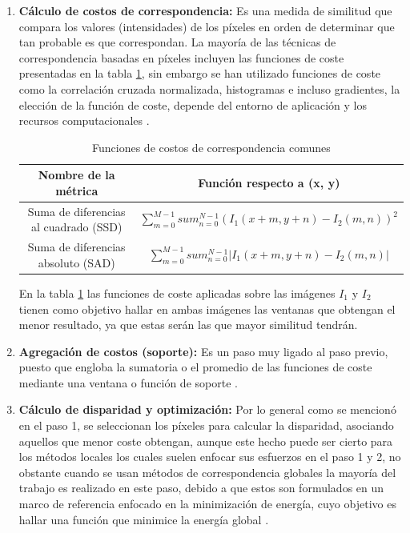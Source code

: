 \begin{enumerate}
    \item \textbf{Cálculo de costos de correspondencia:} Es una medida de similitud que compara los valores (intensidades) de los píxeles en orden de determinar que tan probable es que correspondan. La mayoría de las técnicas de correspondencia basadas en píxeles incluyen las funciones de coste presentadas en la tabla \ref{matchingCostTypes}, sin embargo se han utilizado funciones de coste como la correlación cruzada normalizada, histogramas e incluso gradientes, la elección de la función de coste, depende del entorno de aplicación y los recursos computacionales \cite[p~3]{Scharstein2002}.
    \begin{table}[H]
    \centering
    \renewcommand{\arraystretch}{2}
    \caption{Funciones de costos de correspondencia comunes}
    \label{matchingCostTypes}
    \begin{tabular}{|c|c|}
    \hline
    Nombre de la métrica & Función respecto a (x, y) \\
    \hline
    Suma de diferencias al cuadrado (SSD) & $\sum_{m=0}^{M-1}sum_{n=0}^{N-1}(I_{1}(x+m, y+n) - I_{2}(m, n))^{2}$    \\
    \hline
    Suma de diferencias absoluto (SAD)    & $\sum_{m=0}^{M-1}sum_{n=0}^{N-1}\lvert I_{1}(x+m, y+n) - I_{2}(m, n)\rvert$ \\
    \hline
    \end{tabular}
    \end{table}
    En la tabla \ref{matchingCostTypes} las funciones de coste aplicadas sobre las imágenes $I_{1}$ y $I_{2}$ tienen como objetivo hallar en ambas imágenes las ventanas que obtengan el menor resultado, ya que estas serán las que mayor similitud tendrán.
    \item \textbf{Agregación de costos (soporte):} Es un paso muy ligado al paso previo, puesto que engloba la sumatoria o el promedio de las funciones de coste mediante una ventana o función de soporte \cite[p~4]{Scharstein2002}. 
    \item \textbf{Cálculo de disparidad y optimización:} Por lo general como se mencionó en el paso 1, se seleccionan los píxeles para calcular la disparidad, asociando aquellos que menor coste obtengan, aunque este hecho puede ser cierto para los métodos locales los cuales suelen enfocar sus esfuerzos en el paso 1 y 2, no obstante cuando se usan métodos de correspondencia globales la mayoría del trabajo es realizado en este paso, debido a que estos son formulados en un marco de referencia enfocado en la minimización de energía, cuyo objetivo es hallar una función que minimice la energía global \cite[p~5]{Scharstein2002}.

\end{enumerate}
